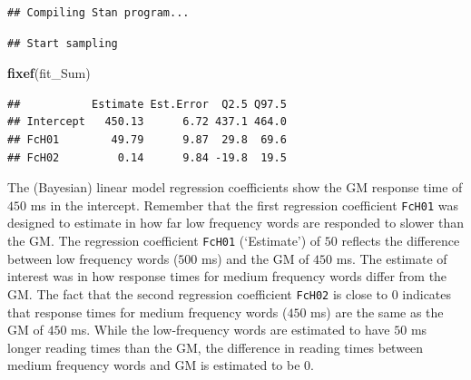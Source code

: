 \documentclass[12pt,]{krantz}
\newenvironment{Shaded}{\begin{snugshade}}{\end{snugshade}}
\newcommand{\KeywordTok}[1]{\textcolor[rgb]{0.13,0.29,0.53}{\textbf{#1}}}
\newcommand{\DataTypeTok}[1]{\textcolor[rgb]{0.13,0.29,0.53}{#1}}
\newcommand{\DecValTok}[1]{\textcolor[rgb]{0.00,0.00,0.81}{#1}}
\newcommand{\StringTok}[1]{\textcolor[rgb]{0.31,0.60,0.02}{#1}}
\newcommand{\OperatorTok}[1]{\textcolor[rgb]{0.81,0.36,0.00}{\textbf{#1}}}
\newcommand{\NormalTok}[1]{#1}
\theoremstyle{definition}
\theoremstyle{definition}
\theoremstyle{definition}
\theoremstyle{remark}
\begin{document}
\begin{Shaded}
\end{Shaded}

\begin{verbatim}
## Compiling Stan program...
\end{verbatim}

\begin{verbatim}
## Start sampling
\end{verbatim}

\begin{Shaded}
\begin{Highlighting}[]
\KeywordTok{fixef}\NormalTok{(fit_Sum)}
\end{Highlighting}
\end{Shaded}

\begin{verbatim}
##           Estimate Est.Error  Q2.5 Q97.5
## Intercept   450.13      6.72 437.1 464.0
## FcH01        49.79      9.87  29.8  69.6
## FcH02         0.14      9.84 -19.8  19.5
\end{verbatim}

The (Bayesian) linear model regression coefficients show the GM response
time of \(450\) ms in the intercept. Remember that the first regression
coefficient \texttt{FcH01} was designed to estimate in how far low
frequency words are responded to slower than the GM. The regression
coefficient \texttt{FcH01} (`Estimate') of \(50\) reflects the
difference between low frequency words (\(500\) ms) and the GM of
\(450\) ms. The estimate of interest was in how response times for
medium frequency words differ from the GM. The fact that the second
regression coefficient \texttt{FcH02} is close to \(0\) indicates that
response times for medium frequency words (\(450\) ms) are the same as
the GM of \(450\) ms. While the low-frequency words are estimated to
have \(50\) ms longer reading times than the GM, the difference in
reading times between medium frequency words and GM is estimated to be
\(0\).
\end{document}
